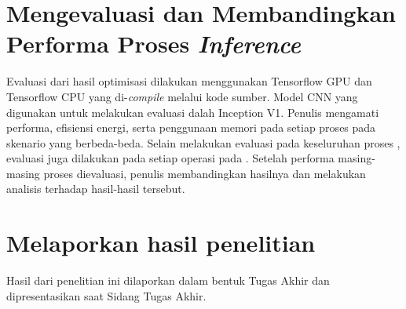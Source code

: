 \section{Mengevaluasi dan Membandingkan Performa Proses \textit{Inference}}
Evaluasi dari hasil optimisasi dilakukan menggunakan Tensorflow GPU dan Tensorflow CPU yang di-\textit{compile} melalui kode sumber. Model CNN yang digunakan untuk melakukan evaluasi dalah Inception V1. Penulis mengamati performa, efisiensi energi, serta penggunaan memori pada setiap proses \inference pada skenario yang berbeda-beda. Selain melakukan evaluasi pada keseluruhan proses \inference, evaluasi juga dilakukan pada setiap operasi pada \operationgraph. Setelah performa masing-masing proses \inference dievaluasi, penulis membandingkan hasilnya dan melakukan analisis terhadap hasil-hasil tersebut.

\section{Melaporkan hasil penelitian}
Hasil dari penelitian ini dilaporkan dalam bentuk Tugas Akhir dan dipresentasikan saat Sidang Tugas Akhir.


